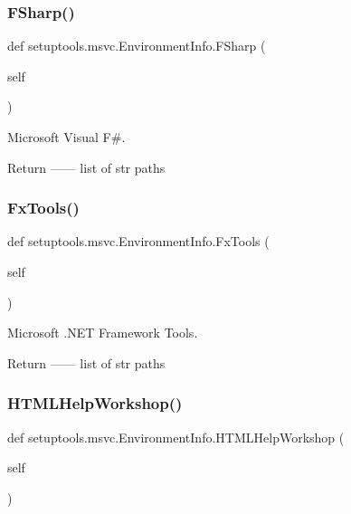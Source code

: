 \subsubsection{\texorpdfstring{F\+Sharp()}{FSharp()}}
{\footnotesize\ttfamily def setuptools.\+msvc.\+Environment\+Info.\+F\+Sharp (\begin{DoxyParamCaption}\item[{}]{self }\end{DoxyParamCaption})}

\begin{DoxyVerb}Microsoft Visual F#.

Return
------
list of str
    paths
\end{DoxyVerb}
 \mbox{\label{classsetuptools_1_1msvc_1_1EnvironmentInfo_ae4038292b85b81482ab5bfb95c2dd592}} 
\subsubsection{\texorpdfstring{Fx\+Tools()}{FxTools()}}
{\footnotesize\ttfamily def setuptools.\+msvc.\+Environment\+Info.\+Fx\+Tools (\begin{DoxyParamCaption}\item[{}]{self }\end{DoxyParamCaption})}

\begin{DoxyVerb}Microsoft .NET Framework Tools.

Return
------
list of str
    paths
\end{DoxyVerb}
 \mbox{\label{classsetuptools_1_1msvc_1_1EnvironmentInfo_a30dfd7226487fa81a4e40f3824f67d63}} 
\subsubsection{\texorpdfstring{H\+T\+M\+L\+Help\+Workshop()}{HTMLHelpWorkshop()}}
{\footnotesize\ttfamily def setuptools.\+msvc.\+Environment\+Info.\+H\+T\+M\+L\+Help\+Workshop (\begin{DoxyParamCaption}\item[{}]{self }\end{DoxyParamCaption})}

